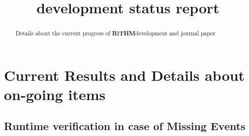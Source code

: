 \documentclass[]{article}
\title{\rithm development status report}
\author{}
\newcommand{\rithm}{\textbf{RiTHM}\space}
\begin{document}
\maketitle

\begin{abstract}
Details about the current progress of \rithm development and journal paper
\end{abstract}
\section{Current Results and Details about on-going items}


	\subsection{Runtime verification in case of Missing Events}
\end{document}
